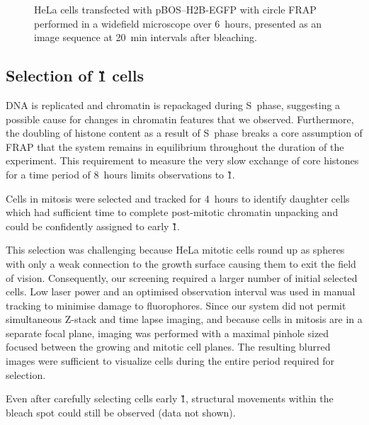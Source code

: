     \begin{figure}
      \centering
        {HeLa cells transfected with pBOS--H2B-EGFP with circle FRAP performed 
        in a widefield microscope over 6~hours, presented as an image sequence 
        at 20~min intervals after bleaching.}
      \label{fig:kill-frap:frap-spot-movement}
    \end{figure}

    \subsection{Selection of \G1{} cells}

    DNA is replicated and chromatin is repackaged during S~phase,
    suggesting a possible cause for changes in chromatin features that we observed. 
    Furthermore, the doubling of histone content as a result of S~phase breaks
    a core assumption of FRAP that the system remains in equilibrium
    throughout the duration of the experiment.
    This requirement to measure the very slow exchange of core histones
    for a time period of 8~hours limits observations to \G1{}.

    Cells in mitosis were selected and tracked for 4~hours to identify daughter cells
    which had sufficient time to complete post-mitotic chromatin unpacking
    and could be confidently assigned to early \G1{}.

    This selection was challenging because HeLa mitotic cells round up
    as spheres with only a weak connection to the growth surface
    causing them to exit the field of vision.
    Consequently, our screening required a larger number of initial selected cells. 
    Low laser power and an optimised observation interval 
    was used in manual tracking to minimise damage to fluorophores.
    Since our system did not permit simultaneous Z-stack and time lapse imaging, 
    and because cells in mitosis are in a separate focal plane,
    imaging was performed with a maximal pinhole sized focused 
    between the growing and mitotic cell planes.
    The resulting blurred images were sufficient to visualize cells during
    the entire period required for selection.

    Even after carefully selecting cells early \G1{},
    structural movements within the bleach spot could still be observed (data not shown).

